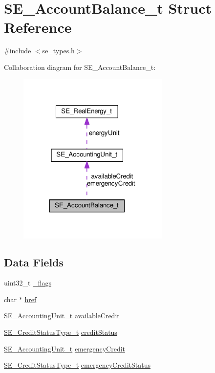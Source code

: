 \hypertarget{structSE__AccountBalance__t}{}\section{S\+E\+\_\+\+Account\+Balance\+\_\+t Struct Reference}
\label{structSE__AccountBalance__t}


{\ttfamily \#include $<$se\+\_\+types.\+h$>$}



Collaboration diagram for S\+E\+\_\+\+Account\+Balance\+\_\+t\+:\nopagebreak
\begin{figure}[H]
\begin{center}
\leavevmode
\includegraphics[width=213pt]{structSE__AccountBalance__t__coll__graph}
\end{center}
\end{figure}
\subsection*{Data Fields}
\begin{DoxyCompactItemize}
\item 
uint32\+\_\+t \hyperlink{group__AccountBalance_ga159898a9138df7e3c536ff9d29b8e812}{\+\_\+flags}
\item 
char $\ast$ \hyperlink{group__AccountBalance_gadccc9402133c6ca77e618358c960068b}{href}
\item 
\hyperlink{structSE__AccountingUnit__t}{S\+E\+\_\+\+Accounting\+Unit\+\_\+t} \hyperlink{group__AccountBalance_ga91ffb617dfc316f5a8e2332846c5834d}{available\+Credit}
\item 
\hyperlink{group__CreditStatusType_gadc768115dd9712a2356f01ac1aab6700}{S\+E\+\_\+\+Credit\+Status\+Type\+\_\+t} \hyperlink{group__AccountBalance_ga77494ec1a8a44d085d63afc1e0f936eb}{credit\+Status}
\item 
\hyperlink{structSE__AccountingUnit__t}{S\+E\+\_\+\+Accounting\+Unit\+\_\+t} \hyperlink{group__AccountBalance_gab10aee5ec25f421ce4a7d4e470d72744}{emergency\+Credit}
\item 
\hyperlink{group__CreditStatusType_gadc768115dd9712a2356f01ac1aab6700}{S\+E\+\_\+\+Credit\+Status\+Type\+\_\+t} \hyperlink{group__AccountBalance_ga93e7a084d8d647dee96f8650febd4683}{emergency\+Credit\+Status}
\end{DoxyCompactItemize}


